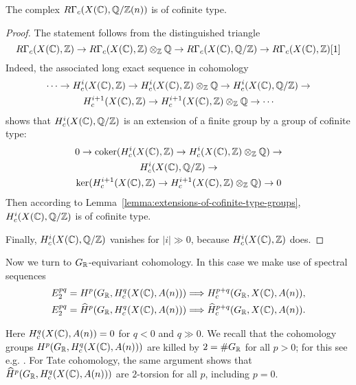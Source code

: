 \documentclass{article}
\numberwithin{equation}{section}
\begin{document}
\begin{lemma}
  The complex $R\Gamma_c (X (\mathbb{C}), \mathbb{Q}/\mathbb{Z} (n))$ is of cofinite type.

  \begin{proof}
    The statement follows from the distinguished triangle
    \[ R\Gamma_c (X (\mathbb{C}), \mathbb{Z}) \to
    R\Gamma_c (X (\mathbb{C}), \mathbb{Z})\otimes_{\mathbb{Z}} \mathbb{Q} \to
    R\Gamma_c (X (\mathbb{C}), \mathbb{Q}/\mathbb{Z}) \to
    R\Gamma_c (X (\mathbb{C}), \mathbb{Z}) [1] \]
    Indeed, the associated long exact sequence in cohomology
    \begin{multline*}
      \cdots \to H^i_c (X (\mathbb{C}), \mathbb{Z}) \to
      H^i_c (X (\mathbb{C}), \mathbb{Z})\otimes_{\mathbb{Z}} \mathbb{Q} \to
      H^i_c (X (\mathbb{C}), \mathbb{Q}/\mathbb{Z}) \to\\
      H^{i+1}_c (X (\mathbb{C}), \mathbb{Z}) \to
      H^{i+1}_c (X (\mathbb{C}), \mathbb{Z})\otimes_{\mathbb{Z}} \mathbb{Q} \to \cdots
    \end{multline*}
    shows that $H^i_c (X (\mathbb{C}), \mathbb{Q}/\mathbb{Z})$ is an extension of a finite group by a
    group of cofinite type:
    \begin{multline*}
      0 \to \operatorname{coker} (H^i_c (X (\mathbb{C}), \mathbb{Z}) \to
      H^i_c (X (\mathbb{C}), \mathbb{Z})\otimes_{\mathbb{Z}} \mathbb{Q}) \to\\
      H^i_c (X (\mathbb{C}), \mathbb{Q}/\mathbb{Z}) \to\\
      \ker (H^{i+1}_c (X (\mathbb{C}), \mathbb{Z}) \to
      H^{i+1}_c (X (\mathbb{C}), \mathbb{Z})\otimes_{\mathbb{Z}} \mathbb{Q}) \to 0
    \end{multline*}
    Then according to Lemma~\ref{lemma:extensions-of-cofinite-type-groups},
    $H^i_c (X (\mathbb{C}), \mathbb{Q}/\mathbb{Z})$ is of cofinite type.

    Finally, $H^i_c (X (\mathbb{C}), \mathbb{Q}/\mathbb{Z})$ vanishes for $|i| \gg 0$, because
    $H^i_c (X (\mathbb{C}), \mathbb{Z})$ does.
  \end{proof}
\end{lemma}

Now we turn to $G_{\mathbb{R}}$-equivariant cohomology. In this case we make use of
spectral sequences
\begin{align*}
  E_2^{pq} = H^p (G_{\mathbb{R}}, H_c^q (X (\mathbb{C}), A (n))) & \Longrightarrow H_c^{p+q} (G_{\mathbb{R}}, X (\mathbb{C}), A (n)), \\
  E_2^{pq} = \widehat{H}^p (G_{\mathbb{R}}, H_c^q (X (\mathbb{C}), A (n))) & \Longrightarrow \widehat{H}_c^{p+q} (G_{\mathbb{R}}, X (\mathbb{C}), A (n)).
\end{align*}

Here $H_c^q (X (\mathbb{C}), A (n)) = 0$ for $q < 0$ and $q \gg 0$. We recall that the
cohomology groups $H^p (G_{\mathbb{R}}, H_c^q (X (\mathbb{C}), A (n)))$ are killed by
$2 = \# G_{\mathbb{R}}$ for all $p > 0$; for this see e.g.
\cite[Theorem~6.5.8]{Weibel-1994}. For Tate cohomology, the same argument shows
that $\widehat{H}^p (G_{\mathbb{R}}, H_c^q (X (\mathbb{C}), A (n)))$ are $2$-torsion for all
$p$, including $p = 0$.
\end{document}
